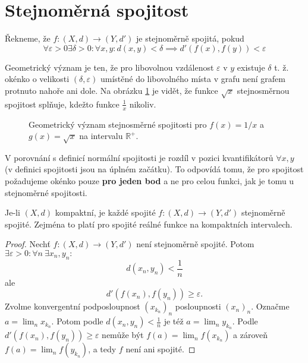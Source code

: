 \documentclass[../main.tex]{subfiles}
\begin{document}
\section{Stejnoměrná spojitost}
\begin{definition}
	Řekneme, že $f : (X,d) \rightarrow (Y,d')$ je stejnoměrně spojitá, pokud
	\[\forall \varepsilon > 0 \exists \delta > 0 : \forall x,y : d(x,y) < \delta \implies d'(f(x),f(y)) < \varepsilon\]
\end{definition}

\begin{intuition}
	Geometrický význam je ten, že pro libovolnou vzdálenost \(\varepsilon\) v \(y\) existuje \(\delta\) t. ž. okénko o velikosti \((\delta, \varepsilon)\) umístěné do libovolného místa v grafu není grafem protnuto nahoře ani dole. Na obrázku \ref{fig:con} je vidět, že funkce \(\sqrt{x}\) stejnosměrnou spojitost splňuje, kdežto funkce \(\frac{1}{x}\) nikoliv.

	\begin{figure}[h]
		\centering
		\subfloat{{\texttt{[image: 06-1]}}}%
		\hspace{3em}
		\subfloat{{\texttt{[image: 06-2]}}}%
		\hspace{3em}
		\subfloat{{\texttt{[image: 06-3]}}}%
		\caption{Geometrický význam stejnosměrné spojitosti pro \(f(x) = 1/x\) a \(g(x) = \sqrt{x}\) na intervalu \(\mathbb{R}^+\).}
		\label{fig:con}
	\end{figure}

	V porovnání s definicí normální spojitosti je rozdíl v pozici kvantifikátorů \(\forall x, y\) (v definici spojitosti jsou na úplném začátku). To odpovídá tomu, že pro spojitost požadujeme okénko pouze \textbf{pro jeden bod} a ne pro celou funkci, jak je tomu u stejnoměrné spojitosti.
\end{intuition}

\begin{theorem}
	Je-li $(X,d)$ kompaktní, je každé spojité $f : (X,d) \rightarrow (Y,d')$ stejnoměrně spojité. Zejména to platí 
	pro spojité reálné funkce na kompaktních intervalech.
\end{theorem}

\begin{proof}
	Nechť $f : (X,d) \rightarrow (Y,d')$ není stejnoměrně spojité. Potom $\exists \varepsilon > 0 : \forall n\ \exists x_n, y_n :$
	\[d(x_n,y_n) < \frac{1}{n}\]
	ale
	\[d'(f(x_n),f(y_n)) \geq \varepsilon.\]
	Zvolme konvergentní podposloupnost $(x_{k_n})_n$ posloupnosti $(x_n)_n$. Označme $a = \lim_n x_{k_n}.$ Potom podle $d(x_n,y_n) < \frac{1}{n}$ je též 
	$a = \lim_n y_{k_n}.$ Podle $d'(f(x_n),f(y_n)) \geq \varepsilon$ nemůže být $f(a) = \lim_n f(x_{k_n})$ a zároveň $f(a) = \lim_n f(y_{k_n})$, 
	a tedy $f$ není ani spojité.
\end{proof}
\end{document}
